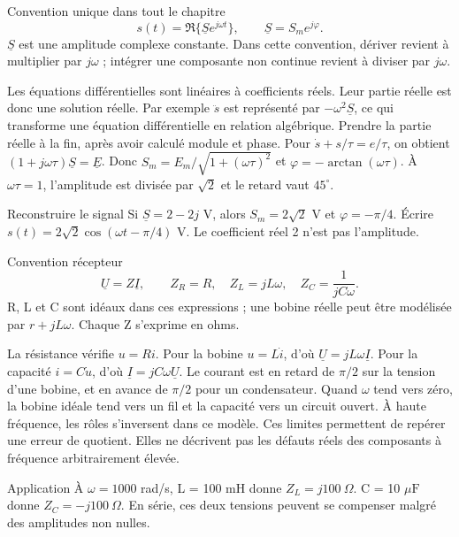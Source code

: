 \begin{loi}{Convention unique dans tout le chapitre}
\[s(t)=\Re\{\underline S e^{j\omega t}\},\qquad \underline S=S_m e^{j\varphi}.\]$\underline S$ est une amplitude complexe constante. Dans cette convention, dériver revient à multiplier par $j\omega$ ; intégrer une composante non continue revient à diviser par $j\omega$.
\end{loi}
Les équations différentielles sont linéaires à coefficients réels. Leur partie réelle est donc une solution réelle. Par exemple $\ddot s$ est représenté par $-\omega^2\underline S$, ce qui transforme une équation différentielle en relation algébrique. Prendre la partie réelle à la fin, après avoir calculé module et phase.
Pour $\dot s+s/\tau=e/\tau$, on obtient $(1+j\omega\tau)\underline S=\underline E$. Donc $S_m=E_m/\sqrt{1+(\omega\tau)^2}$ et $\varphi=-\arctan(\omega\tau)$. À $\omega\tau=1$, l’amplitude est divisée par $\sqrt2$ et le retard vaut $45^\circ$.
\begin{methode}{Reconstruire le signal}
Si $\underline S=2-2j$ V, alors $S_m=2\sqrt2$ V et $\varphi=-\pi/4$. Écrire $s(t)=2\sqrt2\cos(\omega t-\pi/4)$ V. Le coefficient réel 2 n’est pas l’amplitude.
\end{methode}


\begin{loi}{Convention récepteur}
\[\underline U=Z\underline I,\qquad Z_R=R,\quad Z_L=jL\omega,\quad Z_C=\frac1{jC\omega}.\]R, L et C sont idéaux dans ces expressions ; une bobine réelle peut être modélisée par $r+jL\omega$. Chaque Z s’exprime en ohms.
\end{loi}
La résistance vérifie $u=Ri$. Pour la bobine $u=L\dot i$, d’où $\underline U=jL\omega\underline I$. Pour la capacité $i=C\dot u$, d’où $\underline I=jC\omega\underline U$. Le courant est en retard de $\pi/2$ sur la tension d’une bobine, et en avance de $\pi/2$ pour un condensateur.
Quand $\omega$ tend vers zéro, la bobine idéale tend vers un fil et la capacité vers un circuit ouvert. À haute fréquence, les rôles s’inversent dans ce modèle. Ces limites permettent de repérer une erreur de quotient. Elles ne décrivent pas les défauts réels des composants à fréquence arbitrairement élevée.
\begin{docu}{Application}
À $\omega=1000$ rad/s, L = 100 mH donne $Z_L=j100\ \Omega$. C = 10 $\mu\mathrm F$ donne $Z_C=-j100\ \Omega$. En série, ces deux tensions peuvent se compenser malgré des amplitudes non nulles.
\end{docu}


